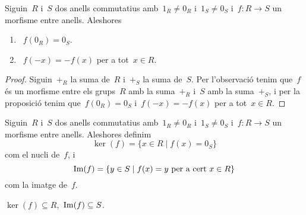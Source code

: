 \documentclass[../../main.tex]{subfiles}
\begin{document}
	\begin{proposition}
		\label{prop:propietats morfismes entre anells}
			Siguin~\(R\) i~\(S\) dos anells commutatius amb~\(1_{R}\neq0_{R}\) i~\(1_{S}\neq0_{S}\) i~\(f\colon R\longrightarrow S\) un morfisme entre anells.
			Aleshores
		\begin{enumerate}
			\item~\(f(0_{R})=0_{S}\).
			\item~\(f(-x)=-f(x)\) per a tot~\(x\in R\).
		\end{enumerate}
		\begin{proof}
			Siguin~\(+_{R}\) la suma de~\(R\) i~\(+_{S}\) la suma de~\(S\).
			Per l'observació  tenim que~\(f\) és un morfisme entre els grups~\(R\) amb la suma~\(+_{R}\) i~\(S\) amb la suma~\(+_{S}\), i per la proposició  tenim que~\(f(0_{R})=0_{S}\) i~\(f(-x)=-f(x)\) per a tot~\(x\in R\).
		\end{proof}
	\end{proposition}
	\begin{definition}
		\label{def:nucli d'un morfisme entre anells}
		\label{def:imatge d'un morfisme entre anells}
		Siguin~\(R\) i~\(S\) dos anells commutatius amb~\(1_{R}\neq0_{R}\) i~\(1_{S}\neq0_{S}\) i~\(f\colon R\longrightarrow S\) un morfisme entre anells.
		Aleshores definim
		\[
		    \ker(f)=\{x\in R\mid f(x)=0_{S}\}
		\]
		com el nucli de~\(f\), i
		\[
		    \operatorname{Im}(f)=\{y\in S\mid f(x)=y\text{ per a cert }x\in R\}
		\]
		com la imatge de~\(f\).
	\end{definition}
	\begin{observation}
		\label{obs:nucli d'un morfisme entre anells es subconjunt del grup d'entrada, imatge n'és del de sortida}
		\(\ker(f)\subseteq R\),~\(\operatorname{Im}(f)\subseteq S\).
	\end{observation}
\end{document}
